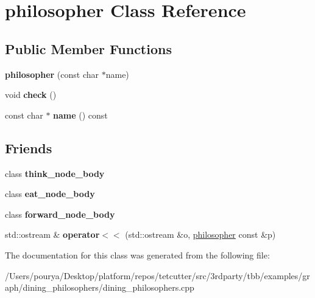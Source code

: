 \hypertarget{classphilosopher}{}\section{philosopher Class Reference}
\label{classphilosopher}
\subsection*{Public Member Functions}
\begin{DoxyCompactItemize}
\item 
\hypertarget{classphilosopher_a709ed591623dc5d358bf09b68ef47603}{}{\bfseries philosopher} (const char $\ast$name)\label{classphilosopher_a709ed591623dc5d358bf09b68ef47603}

\item 
\hypertarget{classphilosopher_a48b53a8ae19509bb674bd8db2b19b1c6}{}void {\bfseries check} ()\label{classphilosopher_a48b53a8ae19509bb674bd8db2b19b1c6}

\item 
\hypertarget{classphilosopher_ada675ed0f695b2f7fa7cf9f7156dc2c7}{}const char $\ast$ {\bfseries name} () const \label{classphilosopher_ada675ed0f695b2f7fa7cf9f7156dc2c7}

\end{DoxyCompactItemize}
\subsection*{Friends}
\begin{DoxyCompactItemize}
\item 
\hypertarget{classphilosopher_a3291ab12a4bfa4c1427b7151c0da6dd3}{}class {\bfseries think\+\_\+node\+\_\+body}\label{classphilosopher_a3291ab12a4bfa4c1427b7151c0da6dd3}

\item 
\hypertarget{classphilosopher_ad4fa57a2f8a182077e12a24047370ade}{}class {\bfseries eat\+\_\+node\+\_\+body}\label{classphilosopher_ad4fa57a2f8a182077e12a24047370ade}

\item 
\hypertarget{classphilosopher_a2e9b09da2541ca471613b1d80cf3a92d}{}class {\bfseries forward\+\_\+node\+\_\+body}\label{classphilosopher_a2e9b09da2541ca471613b1d80cf3a92d}

\item 
\hypertarget{classphilosopher_a1131bc238ee67d8cb18b8aaee45e89b0}{}std\+::ostream \& {\bfseries operator$<$$<$} (std\+::ostream \&o, \hyperlink{classphilosopher}{philosopher} const \&p)\label{classphilosopher_a1131bc238ee67d8cb18b8aaee45e89b0}

\end{DoxyCompactItemize}


The documentation for this class was generated from the following file\+:\begin{DoxyCompactItemize}
\item 
/\+Users/pourya/\+Desktop/platform/repos/tetcutter/src/3rdparty/tbb/examples/graph/dining\+\_\+philosophers/dining\+\_\+philosophers.\+cpp\end{DoxyCompactItemize}

